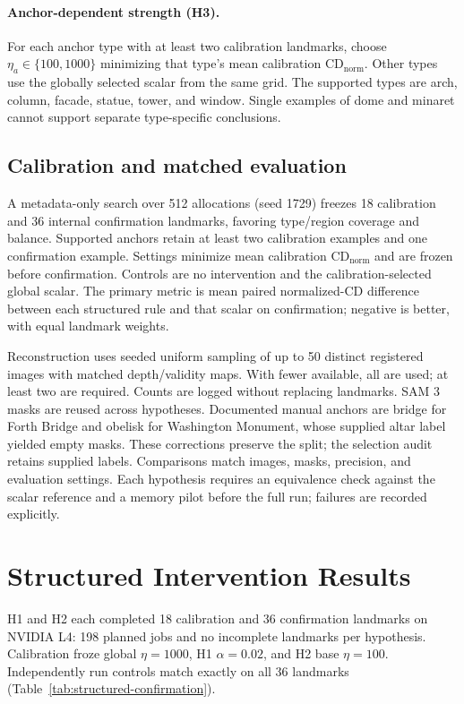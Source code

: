 \documentclass[sigconf,nonacm]{acmart}
\begin{document}
\paragraph{Anchor-dependent strength (H3).}
For each anchor type with at least two calibration landmarks, choose $\eta_a\in\{100,1000\}$ minimizing that type's mean calibration $\mathrm{CD}_{\mathrm{norm}}$. Other types use the globally selected scalar from the same grid. The supported types are arch, column, facade, statue, tower, and window. Single examples of dome and minaret cannot support separate type-specific conclusions.

\subsection{Calibration and matched evaluation}
A metadata-only search over 512 allocations (seed 1729) freezes 18 calibration and 36 internal confirmation landmarks, favoring type/region coverage and balance. Supported anchors retain at least two calibration examples and one confirmation example. Settings minimize mean calibration $\mathrm{CD}_{\mathrm{norm}}$ and are frozen before confirmation. Controls are no intervention and the calibration-selected global scalar. The primary metric is mean paired normalized-CD difference between each structured rule and that scalar on confirmation; negative is better, with equal landmark weights.

Reconstruction uses seeded uniform sampling of up to 50 distinct registered images with matched depth/validity maps. With fewer available, all are used; at least two are required. Counts are logged without replacing landmarks. SAM 3 masks are reused across hypotheses. Documented manual anchors are bridge for Forth Bridge and obelisk for Washington Monument, whose supplied altar label yielded empty masks. These corrections preserve the split; the selection audit retains supplied labels. Comparisons match images, masks, precision, and evaluation settings. Each hypothesis requires an equivalence check against the scalar reference and a memory pilot before the full run; failures are recorded explicitly.

\section{Structured Intervention Results}
\label{sec:point3-results}

H1 and H2 each completed 18 calibration and 36 confirmation landmarks on NVIDIA L4: 198 planned jobs and no incomplete landmarks per hypothesis. Calibration froze global $\eta=1000$, H1 $\alpha=0.02$, and H2 base $\eta=100$. Independently run controls match exactly on all 36 landmarks (Table~\ref{tab:structured-confirmation}).
\end{document}
